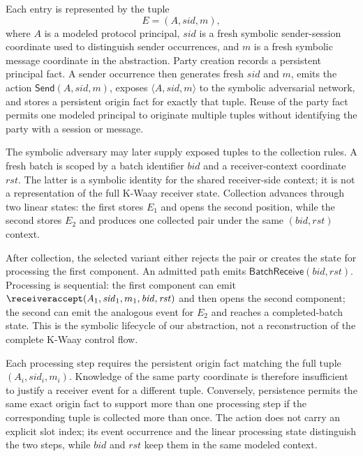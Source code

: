 Each entry is represented by the tuple
\begin{equation}
  E=(A,\mathit{sid},m),
  \label{eq:model-entry-tuple}
\end{equation}
where $A$ is a modeled protocol principal, $\mathit{sid}$ is a fresh
symbolic sender-session coordinate used to distinguish sender occurrences,
and $m$ is a fresh symbolic message coordinate in the abstraction. Party
creation records a persistent principal fact. A sender
occurrence then generates fresh $\mathit{sid}$ and $m$, emits the action
\(\mathsf{Send}(A,\mathit{sid},m)\), exposes
\(\langle A,\mathit{sid},m\rangle\) to the symbolic adversarial network, and
stores a persistent origin fact for exactly that tuple. Reuse of the party
fact permits one modeled principal to originate multiple tuples without
identifying the party with a session or message.

The symbolic adversary may later supply exposed tuples to the collection
rules. A fresh batch is scoped by a batch identifier $\mathit{bid}$ and a
receiver-context coordinate $\mathit{rst}$. The latter is a symbolic identity
for the shared receiver-side context; it is not a representation of the full
K-Waay receiver state. Collection advances through two linear states: the
first stores \(E_1\) and opens the second position, while the second stores
\(E_2\) and produces one collected pair under the same
\((\mathit{bid},\mathit{rst})\) context.

After collection, the selected variant either rejects the pair or creates the
state for processing the first component. An admitted path emits
\(\mathsf{BatchReceive}(\mathit{bid},\mathit{rst})\). Processing is sequential:
the first component can emit
\(\receiveraccept(A_1,\mathit{sid}_1,m_1,\mathit{bid},\mathit{rst})\) and then
opens the second component; the second can emit the analogous event for
\(E_2\) and reaches a completed-batch state. This is the symbolic lifecycle of
our abstraction, not a reconstruction of the complete K-Waay control flow.

Each processing step requires the persistent origin fact matching the full
tuple \((A_i,\mathit{sid}_i,m_i)\). Knowledge of the same party coordinate is
therefore insufficient to justify a receiver event for a different tuple.
Conversely, persistence permits the same exact origin fact to support more
than one processing step if the corresponding tuple is collected more than
once. The \receiveraccept action does not carry an explicit slot index; its
event occurrence and the linear processing state distinguish the two steps,
while $\mathit{bid}$ and $\mathit{rst}$ keep them in the same modeled context.

